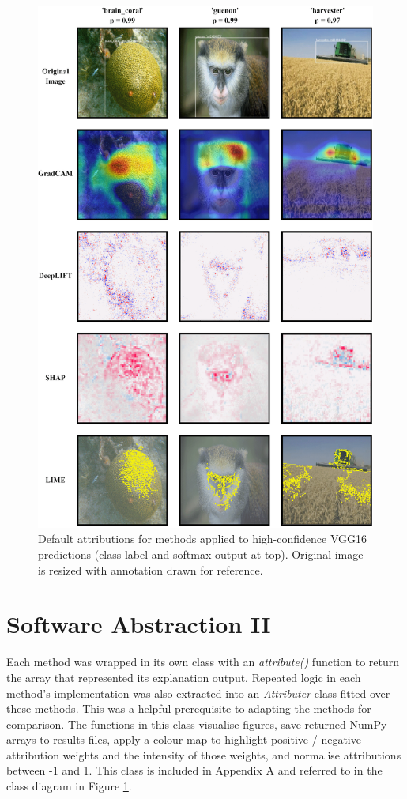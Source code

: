 \documentclass[main]{subfiles}
\begin{document}
\begin{figure}[htbp]
\centering
\includegraphics[scale=0.28]{method_box.png}
\caption{Default attributions for methods applied to high-confidence VGG16 predictions (class label and softmax output at top). Original image is resized with annotation drawn for reference. }
\label{panelimg}
\end{figure}

\section{Software Abstraction II}  \label{sec:sw2}

Each method was wrapped in its own class with an \textit{attribute()} function to return the array that represented its explanation output. Repeated logic in each method's implementation was also extracted into an \textit{Attributer} class fitted over these methods. This was a helpful prerequisite to adapting the methods for comparison. The functions in this class visualise figures, save returned NumPy arrays to results files, apply a colour map to highlight positive / negative attribution weights and the intensity of those weights, and normalise attributions between -1 and 1. This class is included in Appendix A and referred to in the class diagram in Figure \ref{sec:sw2}.
\end{document}
